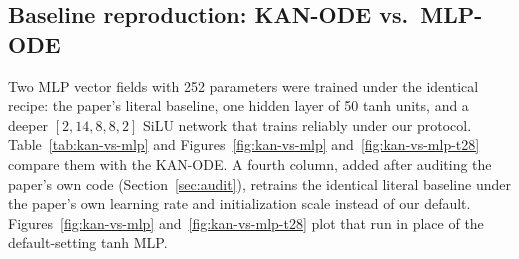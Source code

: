 \subsection{Baseline reproduction: KAN-ODE vs.\ MLP-ODE}
\label{sec:kan-vs-mlp}

Two MLP vector fields with 252 parameters were trained under the identical
recipe: the paper's literal baseline, one hidden layer of 50 tanh units, and
a deeper $[2,14,8,8,2]$ SiLU network that trains reliably under our
protocol. Table~\ref{tab:kan-vs-mlp} and Figures~\ref{fig:kan-vs-mlp}
and~\ref{fig:kan-vs-mlp-t28} compare
them with the KAN-ODE. A fourth column, added after auditing the paper's own
code (Section~\ref{sec:audit}), retrains the identical literal baseline under
the paper's own learning rate and initialization scale instead of our
default. Figures~\ref{fig:kan-vs-mlp} and~\ref{fig:kan-vs-mlp-t28} plot that run
in place of the default-setting tanh MLP.

